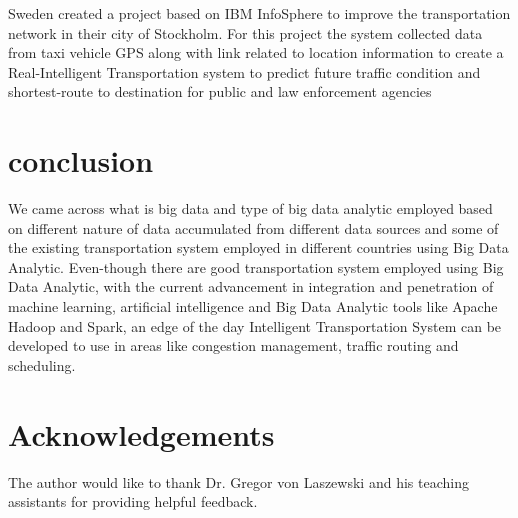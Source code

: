 \documentclass[sigconf]{acmart}
\begin{document}
Sweden created a project based on IBM InfoSphere \cite{bdlt} to improve the transportation network in their city of Stockholm. For this project the system collected data from taxi vehicle GPS along with link related to location information to create a Real-Intelligent Transportation system to predict future traffic condition and shortest-route to destination for public and law enforcement agencies


\section{conclusion}

We came across what is big data and type of big data analytic employed based on different nature of data accumulated from different data sources and some of the existing transportation system employed in different countries using Big Data Analytic. Even-though there are good transportation system employed using Big Data Analytic, with the current advancement in integration and penetration of machine learning, artificial intelligence and Big Data Analytic tools like Apache Hadoop and Spark, an edge of the day Intelligent Transportation System can be developed to use in areas like congestion management, traffic routing and scheduling.

\section*{Acknowledgements}

The author would like to thank Dr. Gregor von Laszewski and his teaching assistants for providing helpful feedback.

\printbibliography
\end{document}
